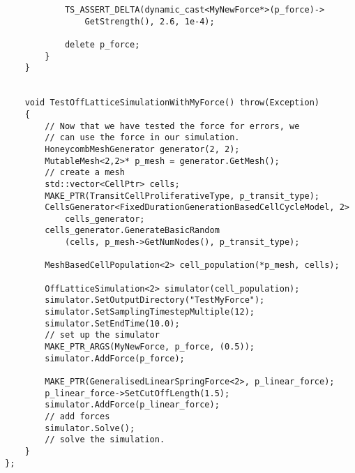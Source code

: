 \begin{lstlisting}
            TS_ASSERT_DELTA(dynamic_cast<MyNewForce*>(p_force)->
				GetStrength(), 2.6, 1e-4);

            delete p_force;
        }
    }
    

    void TestOffLatticeSimulationWithMyForce() throw(Exception)
    {
		// Now that we have tested the force for errors, we 
		// can use the force in our simulation.
        HoneycombMeshGenerator generator(2, 2);
        MutableMesh<2,2>* p_mesh = generator.GetMesh();
		// create a mesh
        std::vector<CellPtr> cells;
        MAKE_PTR(TransitCellProliferativeType, p_transit_type);
        CellsGenerator<FixedDurationGenerationBasedCellCycleModel, 2> 
			cells_generator;
        cells_generator.GenerateBasicRandom
			(cells, p_mesh->GetNumNodes(), p_transit_type);

        MeshBasedCellPopulation<2> cell_population(*p_mesh, cells);

        OffLatticeSimulation<2> simulator(cell_population);
        simulator.SetOutputDirectory("TestMyForce");
        simulator.SetSamplingTimestepMultiple(12);
        simulator.SetEndTime(10.0);
		// set up the simulator
        MAKE_PTR_ARGS(MyNewForce, p_force, (0.5));
        simulator.AddForce(p_force);

        MAKE_PTR(GeneralisedLinearSpringForce<2>, p_linear_force);
        p_linear_force->SetCutOffLength(1.5);
        simulator.AddForce(p_linear_force);
		// add forces
        simulator.Solve();
        // solve the simulation.
    }
};
\end{lstlisting}


